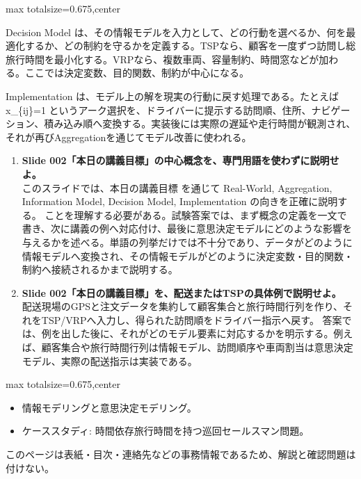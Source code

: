 \begin{adjustbox}{max totalsize={\textwidth}{0.675\textheight},center}
\begin{minipage}{\textwidth}
\begin{minipage}[t]{0.485\textwidth}
Decision Model は、その情報モデルを入力として、どの行動を選べるか、何を最適化するか、どの制約を守るかを定義する。TSPなら、顧客を一度ずつ訪問し総旅行時間を最小化する。VRPなら、複数車両、容量制約、時間窓などが加わる。ここでは決定変数、目的関数、制約が中心になる。\par
Implementation は、モデル上の解を現実の行動に戻す処理である。たとえば x\_\{ij\}=1 というアーク選択を、ドライバーに提示する訪問順、住所、ナビゲーション、積み込み順へ変換する。実装後には実際の遅延や走行時間が観測され、それが再びAggregationを通じてモデル改善に使われる。\par
{}
\begin{enumerate}
\item \textbf{Slide 002「本日の講義目標」の中心概念を、専門用語を使わずに説明せよ。}\\このスライドでは、本日の講義目標 を通じて Real-World, Aggregation, Information Model, Decision Model, Implementation の向きを正確に説明する。 ことを理解する必要がある。試験答案では、まず概念の定義を一文で書き、次に講義の例へ対応付け、最後に意思決定モデルにどのような影響を与えるかを述べる。単語の列挙だけでは不十分であり、データがどのように情報モデルへ変換され、その情報モデルがどのように決定変数・目的関数・制約へ接続されるかまで説明する。
\item \textbf{Slide 002「本日の講義目標」を、配送またはTSPの具体例で説明せよ。}\\配送現場のGPSと注文データを集約して顧客集合と旅行時間行列を作り、それをTSP/VRPへ入力し、得られた訪問順をドライバー指示へ戻す。 答案では、例を出した後に、それがどのモデル要素に対応するかを明示する。例えば、顧客集合や旅行時間行列は情報モデル、訪問順序や車両割当は意思決定モデル、実際の配送指示は実装である。
\end{enumerate}
\end{minipage}
\end{minipage}
\end{adjustbox}

\clearpage
{}
\begin{adjustbox}{max totalsize={\textwidth}{0.675\textheight},center}
\begin{minipage}{\textwidth}\scriptsize
\begin{minipage}[t]{0.485\textwidth}
\begin{itemize}
\item 情報モデリングと意思決定モデリング。
\item ケーススタディ: 時間依存旅行時間を持つ巡回セールスマン問題。
\end{itemize}
\end{minipage}\hfill
\begin{minipage}[t]{0.485\textwidth}
{\small このページは表紙・目次・連絡先などの事務情報であるため、解説と確認問題は付けない。}
\end{minipage}
\end{minipage}
\end{adjustbox}

